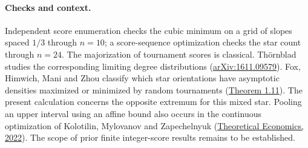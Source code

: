\documentclass[11pt]{article}
\begin{document}
\paragraph{Checks and context.}
Independent score enumeration checks the cubic minimum on a grid of
slopes spaced \(1/3\) through \(n=10\); a score-sequence optimization
checks the star count through \(n=24\).
The majorization of tournament scores is classical. Th\"ornblad studies
the corresponding limiting degree distributions
(\href{https://arxiv.org/abs/1611.09579}{arXiv:1611.09579}).
Fox, Himwich, Mani and Zhou classify which star orientations have
asymptotic densities maximized or minimized by random tournaments
(\href{https://arxiv.org/abs/2402.08418}{Theorem 1.11}).
The present calculation concerns the opposite extremum for this mixed
star. Pooling an upper interval using an affine bound also occurs in
the continuous optimization of Kolotilin, Mylovanov and Zapechelnyuk
(\href{https://doi.org/10.3982/TE4071}{Theoretical Economics, 2022}).
The scope of prior finite integer-score results remains to be established.
\end{document}
